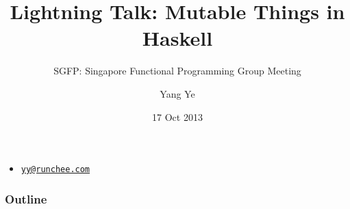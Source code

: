 \documentclass[t]{beamer}
\title{Lightning Talk: Mutable Things in Haskell}
\subtitle{SGFP: Singapore Functional Programming Group Meeting}
\author{Yang Ye}
\institute{Runchee Technology}
\date{17 Oct 2013}
\begin{document}
\begin{frame}
\titlepage
\small{
\begin{itemize}
\item	\href{mailto:yy@runchee.com}{\nolinkurl{yy@runchee.com}}
\end{itemize}
}
\end{frame}

\begin{frame}
\frametitle{Outline}
\tableofcontents
\end{frame}


\end{document}

